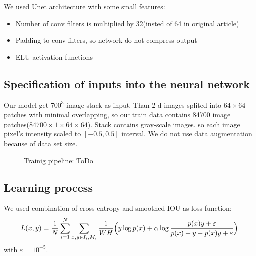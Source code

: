 \documentclass[review]{elsarticle}
\begin{document}
We used Unet architecture  with some small features: 
\begin{itemize}
	\item Number of conv filters is multiplied by 32(insted of 64 in original article)
	\item Padding to conv filters, so network do not compress output
	\item ELU activation functions
	
\end{itemize}

\subsection{Specification of inputs into the neural network}

Our model get $700^3$ image stack as input. Than 2-d images splited into $64 \times 64$ patches with minimal overlapping, so our train data contains 84700 image patches($84700 \times 1 \times 64 \times 64$). Stack contains gray-scale images, so each image pixel's intensity scaled to $[-0.5, 0.5]$ interval. We do not use data augmentation because of data set size.

\begin{figure}[h]
	\caption{Trainig pipeline: ToDo}
	\label{Unet:training}
\end{figure}

\subsection{Learning process}

We used combination of cross-entropy and smoothed IOU as loss function:
\begin{equation}{\label{Loss}}
	L(x, y) = \frac{1}{N} 
		\sum \limits_{i = 1}^{N} 
		\sum \limits_{x, y \in I_{i}, M_{i}} 
		\frac{1}{W H} \Bigl( 
		y \log p(x) 
		+ \alpha \log 
		\frac{p(x) y + \varepsilon}{p(x) + y - p(x)y + \varepsilon}
		\Bigr)
\end{equation}
with $\varepsilon=10^{-5}$.
\end{document}
